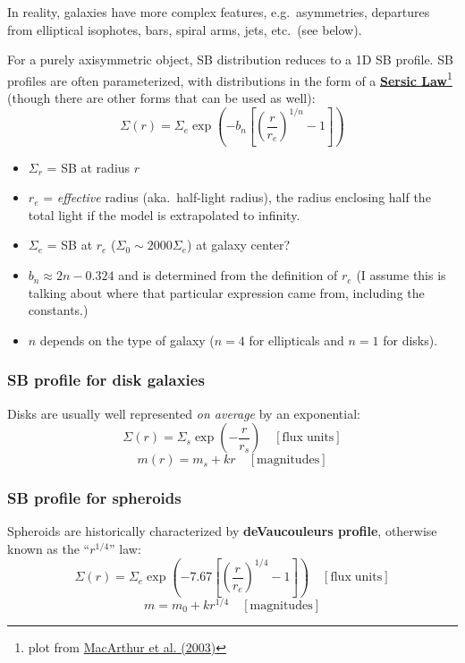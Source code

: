 \documentclass{article}
\newcommand{\mynotes}[1]{\textcolor{cadmiumgreen}{#1}}
\begin{document}
In reality, galaxies have more complex features, e.g.\ asymmetries,
departures from elliptical isophotes, bars, spiral arms, jets, etc.\
(see below).

For a purely axisymmetric object, SB distribution reduces to a 1D SB profile.
SB profiles are often parameterized, with distributions in the form
of a
\href{http://astronomy.nmsu.edu/holtz/a555/html/diagrams/a616/sersic.htm}
{\textbf{Sersic Law}}\footnote{plot from
\href{http://adsabs.harvard.edu/abs/2003ApJ...582..689M}
{MacArthur et al. (2003)}}
(though there are other forms that can be used as well):
\[
    \Sigma(r) = \Sigma_e\exp\left(-b_n\left[\left(
    \frac{r}{r_e}\right)^{1/n}-1\right]\right)
\]
\begin{itemize}
    \item $\Sigma_{r}$ = SB at radius $r$
    \item $r_{e}$ = \textit{effective} radius (aka.\ half-light radius),
        the radius enclosing half the
        total light if the model is extrapolated to infinity.
    \item $\Sigma_{e}$ = SB at $r_{e}$
        ($\Sigma_{0} \sim 2000\Sigma_{e}$) \mynotes{at galaxy center?}
    \item $b_{n} \approx 2n - 0.324$ and is determined from the definition of
        $r_{e}$ \mynotes{(I assume this is talking about where that particular
        expression came from, including the constants.)}
    \item $n$ depends on the type of galaxy ($n=4$ for ellipticals and $n=1$
        for disks).
\end{itemize}
\subsubsection{SB profile for disk galaxies}
Disks are usually well represented \emph{on average} by an exponential:
\[
    \Sigma(r) = \Sigma_{s}\exp\left(-\frac{r}{r_{s}}\right)
    \quad\mathrm{[flux\;units]}
    \]
\[
    m(r) = m_{s} + kr
    \quad\mathrm{[magnitudes]}
    \]

\subsubsection{SB profile for spheroids}
Spheroids are historically characterized by
\textbf{deVaucouleurs profile}, otherwise known as the ``$r^{1/4}$'' law:
\[
    \Sigma(r) = \Sigma_e\exp\left(-7.67\left[\left(
    \frac{r}{r_e}\right)^{1/4}-1\right] \right)
    \quad\mathrm{[flux\;units]}
    \]
\[
    m = m_{0} + kr^{1/4}
    \quad\mathrm{[magnitudes]}
    \]
\end{document}
